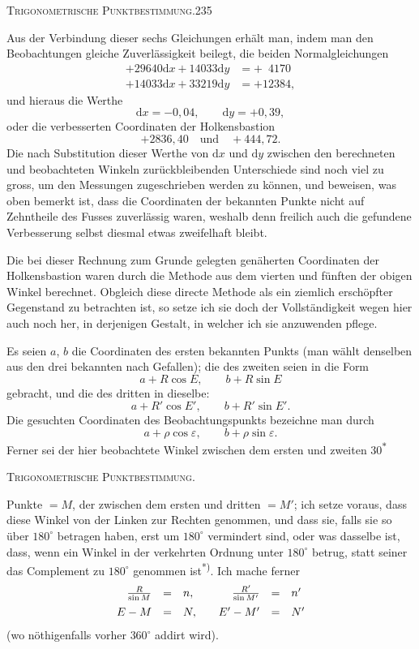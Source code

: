 \clearpage
\noindent\mbox{}\hfill\textsc{Trigonometrische Punktbestimmung.}\hfill235\par\medskip
Aus der Verbindung dieser sechs Gleichungen erhält man, indem man den Beobachtungen gleiche Zuverlässigkeit beilegt, die beiden Normalgleichungen
\[
\begin{aligned}
+29640\mathrm dx+14033\mathrm dy&=+\phantom04170\\
+14033\mathrm dx+33219\mathrm dy&=+12384,
\end{aligned}
\]
und hieraus die Werthe
\[
\mathrm dx=-0{,}04,\qquad\mathrm dy=+0{,}39,
\]
oder die verbesserten Coordinaten der Holkensbastion
\[
+2836{,}40\quad\text{und}\quad+444{,}72.
\]
Die nach Substitution dieser Werthe von $\mathrm dx$ und $\mathrm dy$ zwischen den berechneten und beobachteten Winkeln zurückbleibenden Unterschiede sind noch viel zu gross, um den Messungen zugeschrieben werden zu können, und beweisen, was oben bemerkt ist, dass die Coordinaten der bekannten Punkte nicht auf Zehntheile des Fusses zuverlässig waren, weshalb denn freilich auch die gefundene Verbesserung selbst diesmal etwas zweifelhaft bleibt.

Die bei dieser Rechnung zum Grunde gelegten genäherten Coordinaten der Holkensbastion waren durch die  Methode aus dem vierten und fünften der obigen Winkel berechnet. Obgleich diese directe Methode als ein ziemlich erschöpfter Gegenstand zu betrachten ist, so setze ich sie doch der Vollständigkeit wegen hier auch noch her, in derjenigen Gestalt, in welcher ich sie anzuwenden pflege.

Es seien $a$, $b$ die Coordinaten des ersten bekannten Punkts (man wählt denselben aus den drei bekannten nach Gefallen); die des zweiten seien in die Form
\[
a+R\cos E,\qquad b+R\sin E
\]
gebracht, und die des dritten in dieselbe:
\[
a+R'\cos E',\qquad b+R'\sin E'.
\]
Die gesuchten Coordinaten des Beobachtungspunkts bezeichne man durch
\[
a+\rho\cos\varepsilon,\qquad b+\rho\sin\varepsilon.
\]
Ferner sei der hier beobachtete Winkel zwischen dem ersten und zweiten
\vfill\noindent\hfill30\textsuperscript{$\ast$}\hspace*{2cm}

\clearpage
{}\hfill\textsc{Trigonometrische Punktbestimmung.}\hfill\mbox{}\par\medskip
\noindent Punkte $=M$, der zwischen dem ersten und dritten $=M'$; ich setze voraus, dass diese Winkel von der Linken zur Rechten genommen, und dass sie, falls sie so über $180^\circ$ betragen haben, erst um $180^\circ$ vermindert sind, oder was dasselbe ist, dass, wenn ein Winkel in der verkehrten Ordnung unter $180^\circ$ betrug, statt seiner das Complement zu $180^\circ$ genommen ist\textsuperscript{*)}. Ich mache ferner
\[
\begin{array}{rcl@{\qquad}rcl}
\frac R{\sin M}&=&n,&\frac{R'}{\sin M'}&=&n'\\[5pt]
E-M&=&N,&E'-M'&=&N'
\end{array}
\]
(wo nöthigenfalls vorher $360^\circ$ addirt wird).

